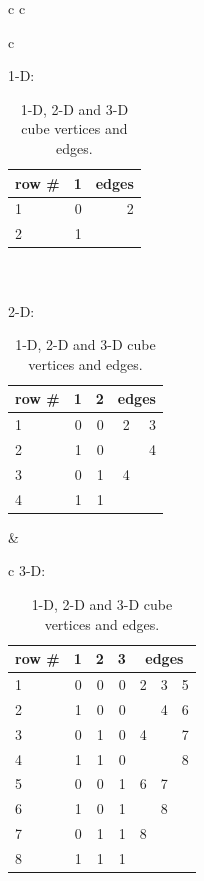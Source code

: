\begin{table}[!h]
  \centering
  \begin{tabular}{c c}

    \begin{tabular}{c}

      1-D: \\

      \begin{tabular}{|l ||r|| r|}
        \hline
        row \# & 1 & edges \\
        \hline
        1 & 0 & 2\\
        \hline
        2 & 1 & \\
        \hline
      \end{tabular}
      \\
      \\
      2-D: \\

      \begin{tabular}{|l ||r|r|| r r|}
        \hline
        row \# & 1 & 2 & \multicolumn{2}{c|}{edges} \\
        \hline
        1 & 0 & 0 & 2 & 3\\
        \hline
        2 & 1 & 0 &  & 4 \\
        \hline
        3 & 0 & 1 &  4 & \\
        \hline
        4 & 1 & 1 &  & \\
        \hline
      \end{tabular}
    \end{tabular}

    &

    \begin{tabular}{c}
      3-D: \\

      \begin{tabular}{|l ||r|r|r|| r r r|}
        \hline
        row \# & 1 & 2 & 3 & \multicolumn{3}{c|}{edges} \\
        \hline
        1 & 0 & 0& 0 & 2 & 3 & 5\\
        \hline
        2 & 1 & 0 & 0 & & 4 & 6\\
        \hline
        3 & 0 & 1 & 0 & 4 & & 7\\
        \hline
        4 & 1 & 1 & 0 & & & 8\\
        \hline
        5 & 0 & 0 & 1 & 6 & 7 & \\
        \hline
        6 & 1 & 0 & 1 & & 8 & \\
        \hline
        7 & 0 & 1 & 1 & 8 & & \\
        \hline
        8 & 1 & 1 & 1 & & & \\
        \hline
      \end{tabular}
    \end{tabular}
  \end{tabular}

  \caption{1-D, 2-D and 3-D cube vertices and edges.}
  \label{verticetable}
\end{table}

